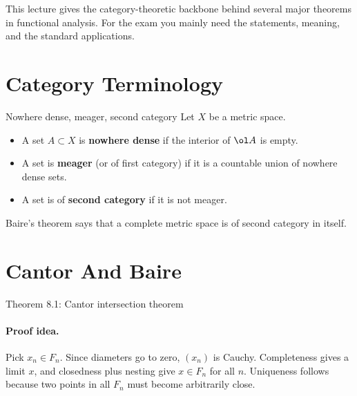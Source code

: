 \documentclass[11pt]{article}
\begin{document}

\vspace{0.8em}

\begin{focusbox}
This lecture gives the category-theoretic backbone behind several major theorems in functional analysis. For the exam you mainly need the statements, meaning, and the standard applications.
\end{focusbox}

\tableofcontents

\section{Category Terminology}

\begin{defbox}{Nowhere dense, meager, second category}
Let $X$ be a metric space.
\begin{itemize}
\item A set $A\subset X$ is \textbf{nowhere dense} if the interior of $\ol A$ is empty.
\item A set is \textbf{meager} (or of first category) if it is a countable union of nowhere dense sets.
\item A set is of \textbf{second category} if it is not meager.
\end{itemize}
\end{defbox}

\begin{focusbox}
Baire's theorem says that a complete metric space is of second category in itself.
\end{focusbox}

\section{Cantor And Baire}

\begin{thmbox}{Theorem 8.1: Cantor intersection theorem}
\thmCantorIntersection
\end{thmbox}

\paragraph{Proof idea.}
Pick $x_n\in F_n$. Since diameters go to zero, $(x_n)$ is Cauchy. Completeness gives a limit $x$, and closedness plus nesting give $x\in F_n$ for all $n$. Uniqueness follows because two points in all $F_n$ must become arbitrarily close.
\end{document}

